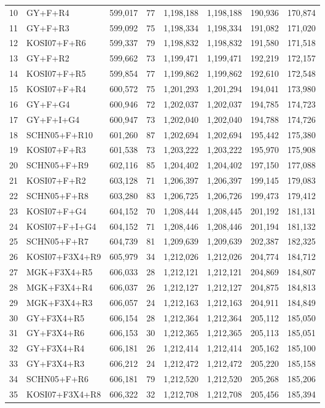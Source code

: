 \begin{longtable}{rlrrrrrr}
10&GY+F+R4&599,017&77&1,198,188&1,198,188&190,936&170,874\\
11&GY+F+R3&599,092&75&1,198,334&1,198,334&191,082&171,020\\
12&KOSI07+F+R6&599,337&79&1,198,832&1,198,832&191,580&171,518\\
13&GY+F+R2&599,662&73&1,199,471&1,199,471&192,219&172,157\\
14&KOSI07+F+R5&599,854&77&1,199,862&1,199,862&192,610&172,548\\
15&KOSI07+F+R4&600,572&75&1,201,293&1,201,294&194,041&173,980\\
16&GY+F+G4&600,946&72&1,202,037&1,202,037&194,785&174,723\\
17&GY+F+I+G4&600,947&73&1,202,040&1,202,040&194,788&174,726\\
18&SCHN05+F+R10&601,260&87&1,202,694&1,202,694&195,442&175,380\\
19&KOSI07+F+R3&601,538&73&1,203,222&1,203,222&195,970&175,908\\
20&SCHN05+F+R9&602,116&85&1,204,402&1,204,402&197,150&177,088\\
21&KOSI07+F+R2&603,128&71&1,206,397&1,206,397&199,145&179,083\\
22&SCHN05+F+R8&603,280&83&1,206,725&1,206,726&199,473&179,412\\
23&KOSI07+F+G4&604,152&70&1,208,444&1,208,445&201,192&181,131\\
24&KOSI07+F+I+G4&604,152&71&1,208,446&1,208,446&201,194&181,132\\
25&SCHN05+F+R7&604,739&81&1,209,639&1,209,639&202,387&182,325\\
26&KOSI07+F3X4+R9&605,979&34&1,212,026&1,212,026&204,774&184,712\\
27&MGK+F3X4+R5&606,033&28&1,212,121&1,212,121&204,869&184,807\\
28&MGK+F3X4+R4&606,037&26&1,212,127&1,212,127&204,875&184,813\\
29&MGK+F3X4+R3&606,057&24&1,212,163&1,212,163&204,911&184,849\\
30&GY+F3X4+R5&606,154&28&1,212,364&1,212,364&205,112&185,050\\
31&GY+F3X4+R6&606,153&30&1,212,365&1,212,365&205,113&185,051\\
32&GY+F3X4+R4&606,181&26&1,212,414&1,212,414&205,162&185,100\\
33&GY+F3X4+R3&606,212&24&1,212,472&1,212,472&205,220&185,158\\
34&SCHN05+F+R6&606,181&79&1,212,520&1,212,520&205,268&185,206\\
35&KOSI07+F3X4+R8&606,322&32&1,212,708&1,212,708&205,456&185,394\\

\end{longtable}
